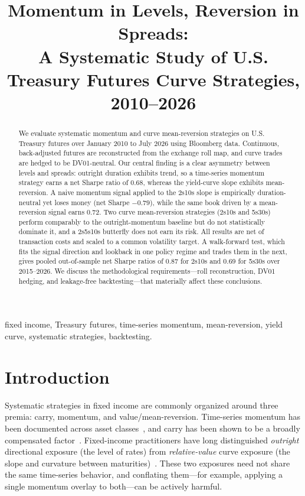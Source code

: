 \documentclass[conference]{IEEEtran}
\begin{document}
\title{Momentum in Levels, Reversion in Spreads:\\
A Systematic Study of U.S. Treasury Futures Curve Strategies, 2010--2026}

\author{
}

\maketitle

\begin{abstract}
We evaluate systematic momentum and curve mean-reversion strategies on U.S.
Treasury futures over January 2010 to July 2026 using Bloomberg data. Continuous,
back-adjusted futures are reconstructed from the exchange roll map, and curve
trades are hedged to be DV01-neutral. Our central finding is a clear asymmetry
between levels and spreads: outright duration exhibits trend, so a time-series
momentum strategy earns a net Sharpe ratio of 0.68, whereas the yield-curve
slope exhibits mean-reversion. A naive momentum signal applied to the 2s10s
slope is empirically duration-neutral yet loses money (net Sharpe $-0.79$),
while the same book driven by a mean-reversion signal earns 0.72. Two curve
mean-reversion strategies (2s10s and 5s30s) perform comparably to the
outright-momentum baseline but do not statistically dominate it, and a
2s5s10s butterfly does not earn its risk. All results are net of transaction
costs and scaled to a common volatility target. A walk-forward test, which fits
the signal direction and lookback in one policy regime and trades them in the
next, gives pooled out-of-sample net Sharpe ratios of 0.87 for 2s10s and 0.69
for 5s30s over 2015--2026. We discuss the methodological requirements---roll
reconstruction, DV01 hedging, and leakage-free backtesting---that materially
affect these conclusions.
\end{abstract}

\begin{IEEEkeywords}
fixed income, Treasury futures, time-series momentum, mean-reversion, yield
curve, systematic strategies, backtesting.
\end{IEEEkeywords}

\section{Introduction}
Systematic strategies in fixed income are commonly organized around three
premia: carry, momentum, and value/mean-reversion. Time-series momentum has
been documented across asset classes~\cite{tsmom}, and carry has been shown to
be a broadly compensated factor~\cite{carry}. Fixed-income practitioners have
long distinguished \emph{outright} directional exposure (the level of rates)
from \emph{relative-value} curve exposure (the slope and curvature between
maturities)~\cite{ilmanen}. These two exposures need not share the same
time-series behavior, and conflating them---for example, applying a single
momentum overlay to both---can be actively harmful.
\end{document}
